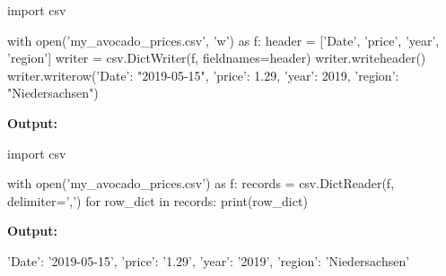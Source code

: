\documentclass[
  american,
  ignorenonframetext,
]{beamer}
\newenvironment{pyexec}[1]{\noindent \textbf{Output: }  #1}{}
\begin{document}
\begin{frame}{}
\protect\hypertarget{section-2}{}

\begin{pythoncode}

import csv

with open('my_avocado_prices.csv', 'w') as f:
    header = ['Date', 'price', 'year', 'region']
    writer = csv.DictWriter(f, fieldnames=header)
    writer.writeheader()
    writer.writerow({'Date': "2019-05-15",
                    'price': 1.29,
                    'year': 2019,
                    'region': "Niedersachsen"})

\end{pythoncode}

\begin{pyexec}

\begin{outputcode}

\end{outputcode}

\end{pyexec}


\end{frame}

\begin{frame}{}
\protect\hypertarget{section-3}{}

\begin{pythoncode}

import csv

with open('my_avocado_prices.csv') as f:
    records = csv.DictReader(f, delimiter=',')
    for row_dict in records:
        print(row_dict)

\end{pythoncode}

\begin{pyexec}

\begin{outputcode}

{'Date': '2019-05-15', 'price': '1.29', 'year': '2019',
'region': 'Niedersachsen'}

\end{outputcode}

\end{pyexec}


\end{frame}
\end{document}
